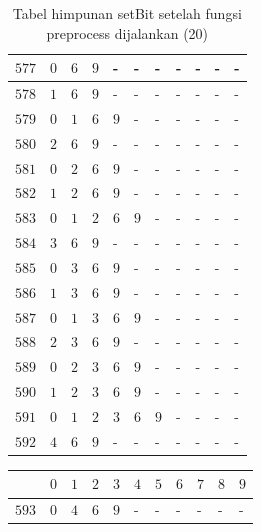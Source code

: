 \begin{appendices}
\begin{table}[H]
\begin{tabular} {|l|l|l|l|l|l|l|l|l|l|l|}
  		$ 577 $ & $ 0 $ &$ 6 $ &$ 9 $ & - &  - &  - &  - &  - &  - &  -   \\ \hline
  		$ 578 $ & $ 1 $ &$ 6 $ &$ 9 $ & - &  - &  - &  - &  - &  - &  -   \\ \hline
  		$ 579 $ & $ 0 $ &$ 1 $ &$ 6 $ &$ 9 $ & - &  - &  - &  - &  - &  -   \\ \hline
  		$ 580 $ & $ 2 $ &$ 6 $ &$ 9 $ & - &  - &  - &  - &  - &  - &  -   \\ \hline
  		$ 581 $ & $ 0 $ &$ 2 $ &$ 6 $ &$ 9 $ & - &  - &  - &  - &  - &  -   \\ \hline
  		$ 582 $ & $ 1 $ &$ 2 $ &$ 6 $ &$ 9 $ & - &  - &  - &  - &  - &  -   \\ \hline
  		$ 583 $ & $ 0 $ &$ 1 $ &$ 2 $ &$ 6 $ &$ 9 $ & - &  - &  - &  - &  -   \\ \hline
  		$ 584 $ & $ 3 $ &$ 6 $ &$ 9 $ & - &  - &  - &  - &  - &  - &  -   \\ \hline
  		$ 585 $ & $ 0 $ &$ 3 $ &$ 6 $ &$ 9 $ & - &  - &  - &  - &  - &  -   \\ \hline
  		$ 586 $ & $ 1 $ &$ 3 $ &$ 6 $ &$ 9 $ & - &  - &  - &  - &  - &  -   \\ \hline
  		$ 587 $ & $ 0 $ &$ 1 $ &$ 3 $ &$ 6 $ &$ 9 $ & - &  - &  - &  - &  -   \\ \hline
  		$ 588 $ & $ 2 $ &$ 3 $ &$ 6 $ &$ 9 $ & - &  - &  - &  - &  - &  -   \\ \hline
  		$ 589 $ & $ 0 $ &$ 2 $ &$ 3 $ &$ 6 $ &$ 9 $ & - &  - &  - &  - &  -   \\ \hline
  		$ 590 $ & $ 1 $ &$ 2 $ &$ 3 $ &$ 6 $ &$ 9 $ & - &  - &  - &  - &  -   \\ \hline
  		$ 591 $ & $ 0 $ &$ 1 $ &$ 2 $ &$ 3 $ &$ 6 $ &$ 9 $ & - &  - &  - &  -   \\ \hline
  		$ 592 $ & $ 4 $ &$ 6 $ &$ 9 $ & - &  - &  - &  - &  - &  - &  -   \\ \hline
  	\end{tabular}\caption{Tabel himpunan setBit setelah fungsi preprocess dijalankan (20)}
  	\label{tab:setbit_20}
  \end{table}
  \begin{table}[H]
  	\centering
  	\begin{tabular} {|l|l|l|l|l|l|l|l|l|l|l|} \hline
  		\backslashbox{$Num$}{$index$} & $ 0 $ & $ 1 $ & $ 2 $ & $ 3 $ & $ 4 $ & $ 5 $ & $ 6 $ & $ 7 $ & $ 8 $ & $ 9 $ \\ \hline
  		$ 593 $ & $ 0 $ &$ 4 $ &$ 6 $ &$ 9 $ & - &  - &  - &  - &  - &  -   \\ \hline

\end{tabular}
\end{table}
\end{appendices}
